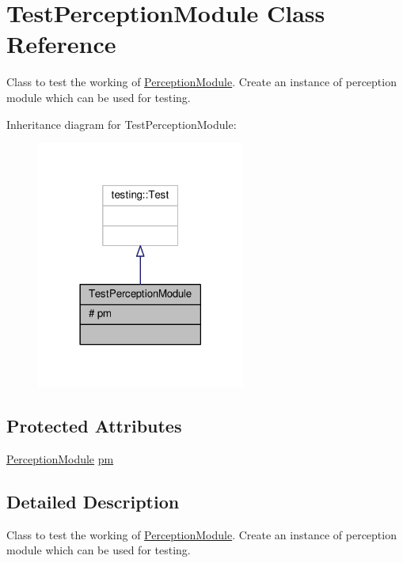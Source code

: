 \hypertarget{class_test_perception_module}{}\section{Test\+Perception\+Module Class Reference}
\label{class_test_perception_module}


Class to test the working of \hyperlink{class_perception_module}{Perception\+Module}. Create an instance of perception module which can be used for testing.  




Inheritance diagram for Test\+Perception\+Module\+:
\nopagebreak
\begin{figure}[H]
\begin{center}
\leavevmode
\includegraphics[width=194pt]{class_test_perception_module__inherit__graph}
\end{center}
\end{figure}
\subsection*{Protected Attributes}
\begin{DoxyCompactItemize}
\item 
\hyperlink{class_perception_module}{Perception\+Module} \hyperlink{class_test_perception_module_a71860459e03b86cd747f283436bcd757}{pm}
\end{DoxyCompactItemize}


\subsection{Detailed Description}
Class to test the working of \hyperlink{class_perception_module}{Perception\+Module}. Create an instance of perception module which can be used for testing. 

